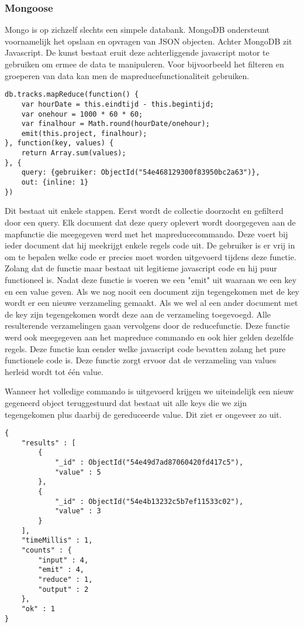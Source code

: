 \documentclass[a4paper,11pt]{article}
\begin{document}
\subsubsection{Mongoose}
Mongo is op zichzelf slechts een simpele databank. MongoDB ondersteunt voornamelijk het opslaan en opvragen van JSON objecten. Achter MongoDB zit Javascript. De kunst bestaat eruit deze achterliggende javascript motor te gebruiken om ermee de data te manipuleren. Voor bijvoorbeeld het filteren en groeperen van data kan men de mapreducefunctionaliteit gebruiken.
\begin{lstlisting}
db.tracks.mapReduce(function() {
	var hourDate = this.eindtijd - this.begintijd;
	var onehour = 1000 * 60 * 60;
	var finalhour = Math.round(hourDate/onehour);
	emit(this.project, finalhour);
}, function(key, values) {
	return Array.sum(values);
}, {
	query: {gebruiker: ObjectId("54e468129300f83950bc2a63")},
	out: {inline: 1}
})
\end{lstlisting}
Dit bestaat uit enkele stappen. Eerst wordt de collectie doorzocht en gefilterd door een query. Elk document dat deze query oplevert wordt doorgegeven aan de mapfunctie die meegegeven werd met het mapreducecommando. Deze voert bij ieder document dat hij meekrijgt enkele regels code uit. De gebruiker is er vrij in om te bepalen welke code er precies moet worden uitgevoerd tijdens deze functie. Zolang dat de functie maar bestaat uit legitieme javascript code en hij puur functioneel is. Nadat deze functie is voeren we een "emit" uit waaraan we een key en een value geven. Als we nog nooit een document zijn tegengekomen met de key wordt er een nieuwe verzameling gemaakt. Als we wel al een ander document met de key zijn tegengekomen wordt deze aan de verzameling toegevoegd. Alle resulterende verzamelingen gaan vervolgens door de reducefunctie. Deze functie werd ook meegegeven aan het mapreduce commando en ook hier gelden dezelfde regels. Deze functie kan eender welke javascript code bevatten zolang het pure functionele code is. Deze functie zorgt ervoor dat de verzameling van values herleid wordt tot één value.

Wanneer het volledige commando is uitgevoerd krijgen we uiteindelijk een nieuw gegeneerd object teruggestuurd dat bestaat uit alle keys die we zijn tegengekomen plus daarbij de gereduceerde value. Dit ziet er ongeveer zo uit.
\begin{lstlisting}
{
	"results" : [
		{
			"_id" : ObjectId("54e49d7ad87060420fd417c5"),
			"value" : 5
		},
		{
			"_id" : ObjectId("54e4b13232c5b7ef11533c02"),
			"value" : 3
		}
	],
	"timeMillis" : 1,
	"counts" : {
		"input" : 4,
		"emit" : 4,
		"reduce" : 1,
		"output" : 2
	},
	"ok" : 1
}
\end{lstlisting}
\end{document}
